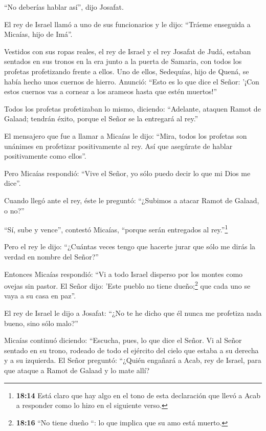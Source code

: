 ``No deberías hablar así'', dijo Josafat.

 El rey de Israel llamó a uno de sus funcionarios y le dijo:
``Tráeme enseguida a Micaías, hijo de Imá''.

 Vestidos con sus ropas reales, el rey de Israel y el rey
Josafat de Judá, estaban sentados en sus tronos en la era junto a la
puerta de Samaria, con todos los profetas profetizando frente a ellos.
 Uno de ellos, Sedequías, hijo de Quená, se había hecho
unos cuernos de hierro. Anunció: ``Esto es lo que dice el Señor: '¡Con
estos cuernos vas a cornear a los arameos hasta que estén muertos!''

 Todos los profetas profetizaban lo mismo, diciendo:
``Adelante, ataquen Ramot de Galaad; tendrán éxito, porque el Señor se
la entregará al rey.''

 El mensajero que fue a llamar a Micaías le dijo: ``Mira,
todos los profetas son unánimes en profetizar positivamente al rey. Así
que asegúrate de hablar positivamente como ellos''.

 Pero Micaías respondió: ``Vive el Señor, yo sólo puedo
decir lo que mi Dios me dice''.

 Cuando llegó ante el rey, éste le preguntó: ``¿Subimos a
atacar Ramot de Galaad, o no?''

``Sí, sube y vence'', contestó Micaías, ``porque serán entregados al
rey.''\footnote{\textbf{18:14} Está claro que hay algo en el tono de
  esta declaración que llevó a Acab a responder como lo hizo en el
  siguiente verso.}

 Pero el rey le dijo: ``¿Cuántas veces tengo que hacerte
jurar que sólo me dirás la verdad en nombre del Señor?''

 Entonces Micaías respondió: ``Vi a todo Israel disperso
por los montes como ovejas sin pastor. El Señor dijo: 'Este pueblo no
tiene dueño;\footnote{\textbf{18:16} ``No tiene dueño ``: lo que implica
  que su amo está muerto.} que cada uno se vaya a su casa en paz''.

 El rey de Israel le dijo a Josafat: ``¿No te he dicho que
él nunca me profetiza nada bueno, sino sólo malo?''

 Micaías continuó diciendo: ``Escucha, pues, lo que dice el
Señor. Vi al Señor sentado en su trono, rodeado de todo el ejército del
cielo que estaba a su derecha y a su izquierda.  El Señor
preguntó: ``¿Quién engañará a Acab, rey de Israel, para que ataque a
Ramot de Galaad y lo mate allí?

